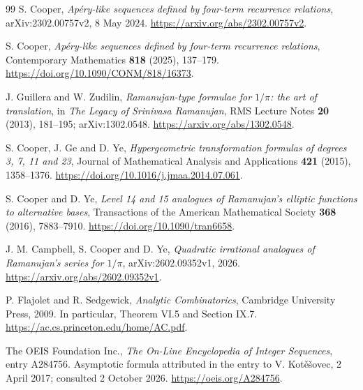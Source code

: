 \documentclass[11pt,letterpaper]{article}
\numberwithin{equation}{section}
\theoremstyle{definition}\newtheorem{definition}[theorem]{Definition}
\theoremstyle{remark}\newtheorem{remark}[theorem]{Remark}
\begin{document}
\begin{thebibliography}{99}
\small
\setlength{\itemsep}{4pt}
S. Cooper, \emph{Ap\'ery-like sequences defined by four-term recurrence relations}, arXiv:2302.00757v2, 8 May 2024.\newline
\url{https://arxiv.org/abs/2302.00757v2}.

S. Cooper, \emph{Ap\'ery-like sequences defined by four-term recurrence relations}, Contemporary Mathematics \textbf{818} (2025), 137--179.\newline
\url{https://doi.org/10.1090/CONM/818/16373}.

J. Guillera and W. Zudilin, \emph{Ramanujan-type formulae for $1/\pi$: the art of translation}, in \emph{The Legacy of Srinivasa Ramanujan}, RMS Lecture Notes \textbf{20} (2013), 181--195; arXiv:1302.0548.\newline
\url{https://arxiv.org/abs/1302.0548}.

S. Cooper, J. Ge and D. Ye, \emph{Hypergeometric transformation formulas of degrees 3, 7, 11 and 23}, Journal of Mathematical Analysis and Applications \textbf{421} (2015), 1358--1376.\newline
\url{https://doi.org/10.1016/j.jmaa.2014.07.061}.

S. Cooper and D. Ye, \emph{Level 14 and 15 analogues of Ramanujan's elliptic functions to alternative bases}, Transactions of the American Mathematical Society \textbf{368} (2016), 7883--7910.\newline
\url{https://doi.org/10.1090/tran6658}.

J. M. Campbell, S. Cooper and D. Ye, \emph{Quadratic irrational analogues of Ramanujan's series for $1/\pi$}, arXiv:2602.09352v1, 2026.\newline
\url{https://arxiv.org/abs/2602.09352v1}.

P. Flajolet and R. Sedgewick, \emph{Analytic Combinatorics}, Cambridge University Press, 2009. In particular, Theorem VI.5 and Section IX.7.\newline
\url{https://ac.cs.princeton.edu/home/AC.pdf}.

The OEIS Foundation Inc., \emph{The On-Line Encyclopedia of Integer Sequences}, entry A284756. Asymptotic formula attributed in the entry to V. Kot\v{e}\v{s}ovec, 2 April 2017; consulted 2 October 2026.\newline
\url{https://oeis.org/A284756}.
\end{thebibliography}
\end{document}
